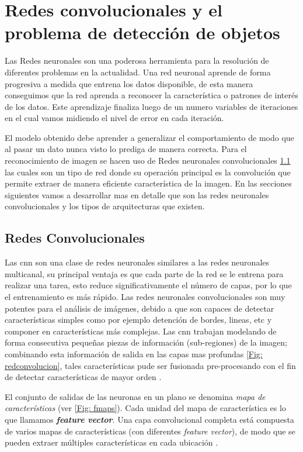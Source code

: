 \section{Redes convolucionales y el problema de detección de objetos}\label{sec:compueter-vision}

Las Redes neuronales son una poderosa herramienta para la resolución de diferentes problemas en la actualidad. Una red neuronal aprende de forma progresiva a medida que entrena los datos disponible, de esta manera conseguimos que la red aprenda a reconocer la característica o patrones de interés de los datos. Este aprendizaje finaliza luego de un numero variables de iteraciones en el cual vamos midiendo el nivel de error en cada iteración.

El modelo obtenido debe aprender a generalizar el comportamiento de modo que al pasar un dato nunca visto lo prediga de manera correcta. Para el reconocimiento de imagen se hacen uso de Redes neuronales convolucionales \ref{sub:cnn} las cuales son un tipo de red donde su operación principal es la convolución que permite extraer de manera eficiente característica de la imagen.   En las secciones siguientes vamos a desarrollar mas en detalle que son las redes neuronales convolucionales y los tipos de arquitecturas que existen. 


\subsection{Redes Convolucionales}\label{sub:cnn}

Las \ac{cnn} son una clase de redes neuronales  similares a las redes neuronales multicanal, su principal ventaja es que cada parte de la red se le entrena para realizar una tarea, esto reduce significativamente el número de capas, por lo que el entrenamiento es más rápido. Las redes neuronales convolucionales son muy potentes para el análisis de imágenes, debido a que son capaces de detectar características simples como por ejemplo detención de bordes, lineas, etc y componer en características más complejas. Las \ac{cnn} trabajan modelando de forma consecutiva pequeñas piezas de información (sub-regiones) de la imagen; combinando esta información de salida en las capas mas profundas \ref{Fig: redconvolucion}, tales características pude ser fusionada pre-procesando con el fin de detectar características de mayor orden \citep{murphy}.

El conjunto de salidas de las neuronas en un plano se denomina \textit{mapa de características} (ver \ref{Fig: fmaps}). Cada unidad  del mapa de característica es lo que llamamos  \textit{\textbf{feature vector}}. Una capa convolucional completa está compuesta de varios mapas de características (con diferentes 
\textit{feature vector}), de modo que se pueden extraer múltiples características en cada ubicación \citep{cnns}.

